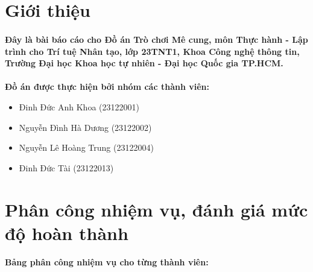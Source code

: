 \section{Giới thiệu}

\paragraph{}{\textbf{Đây là bài báo cáo cho Đồ án Trò chơi Mê cung, môn Thực hành - Lập trình cho Trí tuệ Nhân tạo, lớp 23TNT1, Khoa Công nghệ thông tin, Trường Đại học Khoa học tự nhiên - Đại học Quốc gia TP.HCM.}}

\paragraph{}{\textbf{Đồ án được thực hiện bởi nhóm các thành viên:}}

\begin{itemize}
    \item Đinh Đức Anh Khoa (23122001)
    \item Nguyễn Đình Hà Dương (23122002)
    \item Nguyễn Lê Hoàng Trung (23122004)
    \item Đinh Đức Tài (23122013)
\end{itemize}

\section{Phân công nhiệm vụ, đánh giá mức độ hoàn thành}

\textbf{Bảng phân công nhiệm vụ cho từng thành viên:}

